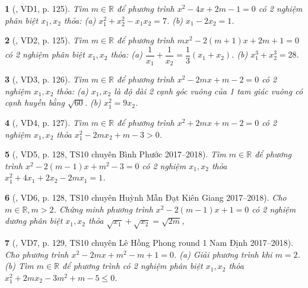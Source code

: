 \documentclass{article}
\newtheorem{baitoan}{}
\begin{document}
\begin{baitoan}[\cite{Thu_Viet_Minh_ptb2}, VD1, p. 125]
	Tìm $m\in\mathbb{R}$ để phương trình $x^2 - 4x + 2m - 1 = 0$ có 2 nghiệm phân biệt $x_1,x_2$ thỏa: (a) $x_1^2 + x_2^2 - x_1x_2 = 7$. (b) $x_1 - 2x_2 = 1$.
\end{baitoan}

\begin{baitoan}[\cite{Thu_Viet_Minh_ptb2}, VD2, p. 125]
	Tìm $m\in\mathbb{R}$ để phương trình $mx^2 - 2(m + 1)x + 2m + 1 = 0$ có 2 nghiệm phân biệt $x_1,x_2$ thỏa: (a) $\dfrac{1}{x_1} + \dfrac{1}{x_2} = \dfrac{1}{3}(x_1 + x_2)$. (b) $x_1^3 + x_2^3 = 28$.
\end{baitoan}

\begin{baitoan}[\cite{Thu_Viet_Minh_ptb2}, VD3, p. 126]
	Tìm $m\in\mathbb{R}$ để phương trình $x^2 - 2mx + m - 2 = 0$ có 2 nghiệm $x_1,x_2$ thỏa: (a) $x_1,x_2$ là độ dài 2 cạnh góc vuông của 1 tam giác vuông có cạnh huyền bằng $\sqrt{60}$. (b) $x_1^2 = 9x_2$.
\end{baitoan}

\begin{baitoan}[\cite{Thu_Viet_Minh_ptb2}, VD4, p. 127]
	Tìm $m\in\mathbb{R}$ để phương trình $x^2 + 2mx + m - 2 = 0$ có 2 nghiệm $x_1,x_2$ thỏa $x_1^2 - 2mx_2 + m - 3 > 0$.
\end{baitoan}

\begin{baitoan}[\cite{Thu_Viet_Minh_ptb2}, VD5, p. 128, TS10 chuyên Bình Phước 2017--2018]
	Tìm $m\in\mathbb{R}$ để phương trình $x^2 - 2(m - 1)x + m^2 - 3 = 0$ có 2 nghiệm $x_1,x_2$ thỏa $x_1^2 + 4x_1 + 2x_2 - 2mx_1 = 1$.
\end{baitoan}

\begin{baitoan}[\cite{Thu_Viet_Minh_ptb2}, VD6, p. 128, TS10 chuyên Huỳnh Mẫn Đạt Kiên Giang 2017--2018]
	Cho $m\in\mathbb{R},m > 2$. Chứng minh phương trình $x^2 - 2(m - 1)x + 1 = 0$ có 2 nghiệm dương phân biệt $x_1,x_2$ thỏa $\sqrt{x_1} + \sqrt{x_2} = \sqrt{2m}$,
\end{baitoan}

\begin{baitoan}[\cite{Thu_Viet_Minh_ptb2}, VD7, p. 129, TS10 chuyên Lê Hồng Phong round 1 Nam Định 2017--2018]
	Cho phương trình $x^2 - 2mx + m^2 - m + 1 = 0$. (a) Giải phương trình khi $m = 2$. (b) Tìm $m\in\mathbb{R}$ để phương trình có 2 nghiệm phân biệt $x_1,x_2$ thỏa $x_1^2 + 2mx_2 - 3m^2 + m - 5\le0$.
\end{baitoan}
\end{document}
